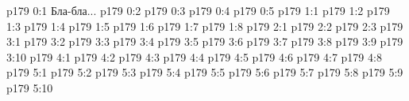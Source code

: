 \author{Промежуточные создания}
\vs p179 0:1  Бла-бла...
\vs p179 0:2 
\vs p179 0:3 
\vs p179 0:4 
\vs p179 0:5 
\vs p179 1:1 
\vs p179 1:2 
\vs p179 1:3 
\vs p179 1:4 
\vs p179 1:5 
\vs p179 1:6 \pc 
\vs p179 1:7 \pc 
\vs p179 1:8 
\vs p179 2:1 
\vs p179 2:2 
\vs p179 2:3 
\vs p179 3:1 
\vs p179 3:2 
\vs p179 3:3 
\vs p179 3:4 
\vs p179 3:5 
\vs p179 3:6 
\vs p179 3:7 
\vs p179 3:8 \pc 
\vs p179 3:9 
\vs p179 3:10 
\vs p179 4:1 
\vs p179 4:2 
\vs p179 4:3 
\vs p179 4:4 
\vs p179 4:5 
\vs p179 4:6 
\vs p179 4:7 \pc 
\vs p179 4:8 
\vs p179 5:1 
\vs p179 5:2 
\vs p179 5:3 
\vs p179 5:4 \pc 
\vs p179 5:5 
\vs p179 5:6 
\vs p179 5:7 \pc 
\vs p179 5:8 
\vs p179 5:9 
\vs p179 5:10 
\quizlink
